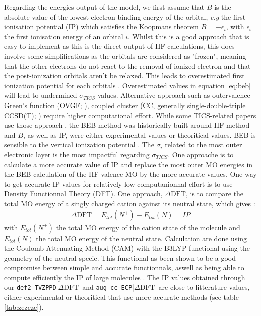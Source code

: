 \documentclass[article,preview]{planetary}
\newcommand{\dft}{\ensuremath{\Delta\textrm{DFT}}}
\begin{document}
Regarding the energies output of the model, we first assume that $B$ is the absolute value of the lowest electron binding energy of the orbital, \textit{e.g} the first ionisation potential (IP) which satisfies the Koopmans theorem $B = -\epsilon_i$, with $\epsilon_i$ the first ionisation energy of an orbital $i$. Whilst this is a good approach that is easy to implement as this is the direct output of HF calculations, this does involve some simplifications as the orbitals are considered as "frozen", meaning that the other electrons do not react to the removal of ionized electron and that the post-ionization orbitals aren't be relaxed. This leads to overestimated first ionization potential for each orbitals \parencites{colonnaKoopmansCompliantFunctionalsPotentials2019, wangIonizaPotenJP102026,jesenekPartialIonisationCross2025,scottElectronImpactIonizationCross2005, wangGeometryOptimizationMade2016}. Overestimated values in equation \ref{eq:beb} will lead to undermined $\sigma_{TICS}$ values. Alternative approach such as outervalence Green’s function (OVGF; \cite{vonniessenComputationalMethodsOneparticle1984,hwangNewModelElectronimpact1996,scottElectronImpactIonizationCross2005}), coupled cluster (CC, generally single-double-triple  CCSD(T); \cite{gachesAstrochemistryLowenergyElectron2024,giulianiIonizationEnergiesPolycyclic2026}) require higher computational effort. While some TICS-related papers use those approach \parencites{scottElectronImpactIonizationCross2005,gachesAstrochemistryLowenergyElectron2024}, the BEB method was historically built around HF method and $B$, as well as IP, were either experimental values or theoritical values. 
BEB is sensible to the vertical ionization potential \parencite{hwangNewModelElectronimpact1996,gachesAstrochemistryLowenergyElectron2024}. The $\sigma_i$ related to the most outer electronic layer is the most impactful regarding $\sigma_{TICS}$. One approache is to calculate a more accurate value of IP and replace the most outer MO energies in the BEB calculation of the HF valence MO by the more accurate values. One way to get accurate IP values for relatively low computanionnal effort is to use Density Functionnal Theory (DFT). One approach, \dft, is to compare the total MO energy of a singly charged cation against its neutral state, which gives \parencites{wangFe3dOrbital2025}:
\begin{align}
    \dft = E_{tot}(N^+) - E_{tot}(N) = IP
\end{align}
with $E_{tot}(N^+)$ the total MO energy of the cation state of the molecule and $E_{tot}(N)$ the total MO energy of the neutral state. Calculation are done using the Coulomb-Attenuating Method (CAM) with the B3LYP functional \parencites{yanaiNewHybridExchange2004} using the geometry of the neutral specie. This functional as been shown to be a good compromise between simple and accurate functionnals, aswell as being able to compute efficiently the IP of large molecules \parencite{giulianiIonizationEnergiesPolycyclic2026}. The IP values obtained through our \verb|def2-TVZPPD||\dft~and \verb|aug-cc-ECP||\dft~are close to litterature values, either experimental or theoritical that use more accurate methods (see table \ref{tab:zezeze}). 
\end{document}
